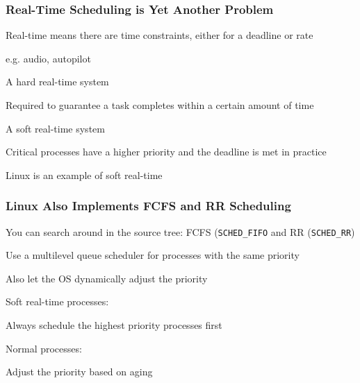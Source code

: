   \begin{frame}
    \frametitle{Real-Time Scheduling is Yet Another Problem}

    Real-time means there are time constraints, either for a deadline or rate

    \hspace{2em} e.g. audio, autopilot

    \vspace{2em}

    A hard real-time system

    \hspace{2em} Required to guarantee a task completes within a certain amount
    of time

    \vspace{2em}

    A soft real-time system

    \hspace{2em} Critical processes have a higher priority and the deadline is
    met in practice

    \vspace{2em}

    Linux is an example of soft real-time
  \end{frame}

  \begin{frame}
    \frametitle{Linux Also Implements FCFS and RR Scheduling}

    You can search around in the source tree: FCFS (\texttt{SCHED\_FIFO} and RR (\texttt{SCHED\_RR})

    \vspace{2em}

    Use a multilevel queue scheduler for processes with the same priority

    \hspace{2em} Also let the OS dynamically adjust the priority

    \vspace{2em}

    Soft real-time processes:

    \hspace{2em} Always schedule the highest priority processes first

    Normal processes:

    \hspace{2em} Adjust the priority based on aging
  \end{frame}

